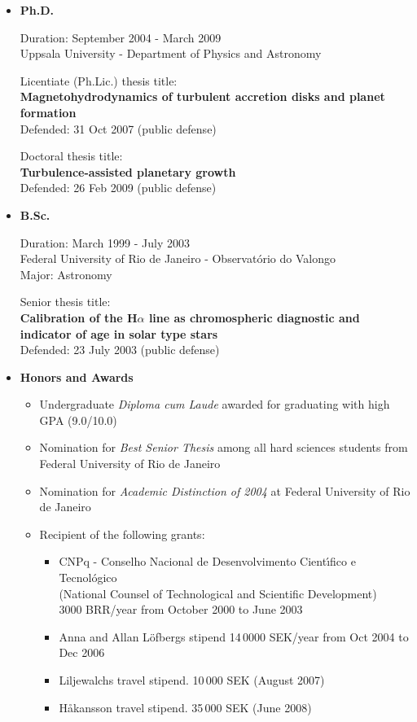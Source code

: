 \documentclass{article}
\begin{document}
\begin{itemize}

\item{{\bf Ph.D.}

Duration: September 2004 - March 2009 \\
Uppsala University  - Department of Physics and Astronomy

Licentiate (Ph.Lic.) thesis title: \\
{\bf Magnetohydrodynamics of turbulent accretion disks and planet formation }\\
Defended: 31 Oct 2007 (public defense)

Doctoral thesis title: \\
{\bf Turbulence-assisted planetary growth}\\
Defended: 26 Feb 2009 (public defense)}

\item{{\bf B.Sc.}

Duration: March 1999 - July 2003 \\
Federal University of Rio de Janeiro - Observat{\'o}rio do Valongo\\
Major: Astronomy

Senior thesis title:\\ 
{\bf Calibration of the H$\alpha$ line as chromospheric diagnostic and indicator of age in solar type stars}\\
Defended: 23 July 2003 (public defense)}

\item{{\bf Honors and Awards}

\begin{itemize}

\item{Undergraduate {\it Diploma cum Laude} awarded for graduating with high GPA (9.0/10.0)}
\item{Nomination for {\it Best Senior Thesis} among all hard sciences students from Federal University of Rio de Janeiro}
\item{Nomination for {\it Academic Distinction of 2004} at Federal University of Rio de Janeiro} 
\item{Recipient of the following grants:}
  \begin{itemize}
    \item{CNPq - Conselho Nacional de Desenvolvimento Cient{\'\i}fico e Tecnol{\'o}gico\\
    (National Counsel of Technological and Scientific Development)\\ 
    3000 BRR/year from October 2000 to June 2003}
    \item{Anna and Allan L\"ofbergs stipend 14\,0000 SEK/year from Oct 2004 to Dec 2006}
    \item{Liljewalchs travel stipend. 10\,000 SEK (August 2007)}  
    \item{H{\aa}kansson travel stipend. 35\,000 SEK (June 2008)}  
  \end{itemize}
\end{itemize}}



\end{itemize}
\end{document}
